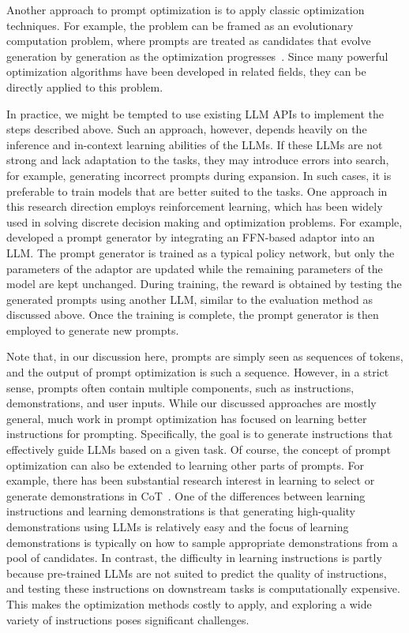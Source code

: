 Another approach to prompt optimization is to apply classic optimization techniques. For example, the problem can be framed as an evolutionary computation problem, where prompts are treated as candidates that evolve generation by generation as the optimization progresses~\cite{guo-etal:2024connecting}. Since many powerful optimization algorithms have been developed in related fields, they can be directly applied to this problem.

In practice, we might be tempted to use existing LLM APIs to implement the steps described above. Such an approach, however, depends heavily on the inference and in-context learning abilities of the LLMs. If these LLMs are not strong and lack adaptation to the tasks, they may introduce errors into search, for example, generating incorrect prompts during expansion. In such cases, it is preferable to train models that are better suited to the tasks. One approach in this research direction employs reinforcement learning, which has been widely used in solving discrete decision making and optimization problems. For example, \citet{deng-etal:2022rlprompt} developed a prompt generator by integrating an FFN-based adaptor into an LLM. The prompt generator is trained as a typical policy network, but only the parameters of the adaptor are updated while the remaining parameters of the model are kept unchanged. During training, the reward is obtained by testing the generated prompts using another LLM, similar to the evaluation method as discussed above. Once the training is complete, the prompt generator is then employed to generate new prompts.

Note that, in our discussion here, prompts are simply seen as sequences of tokens, and the output of prompt optimization is such a sequence. However, in a strict sense, prompts often contain multiple components, such as instructions, demonstrations, and user inputs. While our discussed approaches are mostly general, much work in prompt optimization has focused on learning better instructions for prompting. Specifically, the goal is to generate instructions that effectively guide LLMs based on a given task. Of course, the concept of prompt optimization can also be extended to learning other parts of prompts. For example, there has been substantial research interest in learning to select or generate demonstrations in CoT~\cite{liu-etal:2022makes,rubin-etal:2022learning,zhang-etal:2023automatic}. One of the differences between learning instructions and learning demonstrations is that generating high-quality demonstrations using LLMs is relatively easy and the focus of learning demonstrations is typically on how to sample appropriate demonstrations from a pool of candidates. In contrast, the difficulty in learning instructions is partly because pre-trained LLMs are not suited to predict the quality of instructions, and testing these instructions on downstream tasks is computationally expensive. This makes the optimization methods costly to apply, and exploring a wide variety of instructions poses significant challenges.


